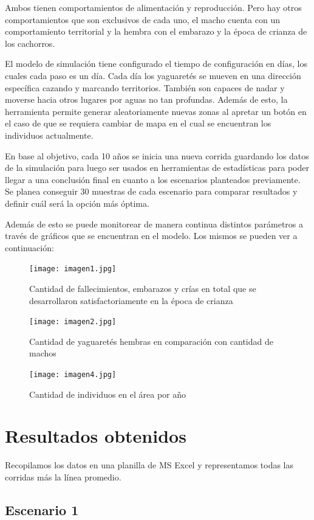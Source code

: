     Ambos tienen comportamientos de alimentación y reproducción. Pero hay otros comportamientos que son exclusivos de cada uno, el macho cuenta con un comportamiento territorial y la hembra con el embarazo y la época de crianza de los cachorros.


    El modelo de simulación tiene configurado el tiempo de configuración en días, los cuales cada paso es un día. Cada día los yaguaretés se mueven en una dirección específica cazando y marcando territorios. También son capaces de nadar y moverse hacia otros lugares por aguas no tan profundas. Además de esto, la herramienta permite generar aleatoriamente nuevas zonas al apretar un botón en el caso de que se requiera cambiar de mapa en el cual se encuentran los individuos actualmente.

    En base al objetivo, cada 10 años se inicia una nueva corrida guardando los datos de la simulación para luego ser usados en herramientas de estadísticas para poder llegar a una conclusión final en cuanto a los escenarios planteados previamente. Se planea conseguir 30 muestras de cada escenario para comparar resultados y definir cuál será la opción más óptima.
    
    Además de esto se puede monitorear de manera continua distintos parámetros a través de gráficos que se encuentran en el modelo. 
    Los mismos se pueden ver a continuación:
    
    \begin{figure}[!htb]
        \centering
        \texttt{[image: imagen1.jpg]}
        \caption{Cantidad de fallecimientos, embarazos y crías en total que se desarrollaron satisfactoriamente en la época de crianza}
        \label{fig:fig1}
        \bigskip
        \centering
        \texttt{[image: imagen2.jpg]}
        \caption{Cantidad de yaguaretés hembras en comparación con cantidad de machos}
        \label{fig:fig2}
        \bigskip
        \centering
        \texttt{[image: imagen4.jpg]}
        \caption{Cantidad de individuos en el área por año}
        \label{fig:fig4}
    \end{figure}

\section{Resultados obtenidos}

    Recopilamos los datos en una planilla de MS Excel y representamos todas las corridas más la línea promedio.

    \subsection{Escenario 1}

